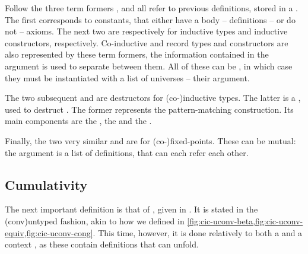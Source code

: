Follow the three term formers ,  and
 all refer to previous definitions, stored in a .
The first corresponds to constants, that either have a body – definitions –
or do not – axioms. The next two are respectively for
inductive types and inductive constructors, respectively. Co-inductive and record types and
constructors are also represented by these term formers, the information contained in the
 argument is used to separate between them.
All of these can be , in which case they must be instantiated
with a list of universes – their  argument.

The two subsequent  and  are destructors for (co-)inductive types. The
latter is a , used to destruct . The former represents the
pattern-matching construction. Its main components are the  , the
  and the  .

Finally, the two very similar  and  are for (co-)fixed-points. 
These can be mutual: the  argument is a list of definitions,
that can each refer each other.

\subsection{Cumulativity}

The next important definition is that of , given in .%
It is stated in the  \kl(conv){untyped} fashion,
akin to how we defined  in
\cref{fig:cic-uconv-beta,fig:cic-uconv-equiv,fig:cic-uconv-cong}.
This time, however, it is done relatively to
both a   and a context ,
as these contain definitions that  can unfold.

